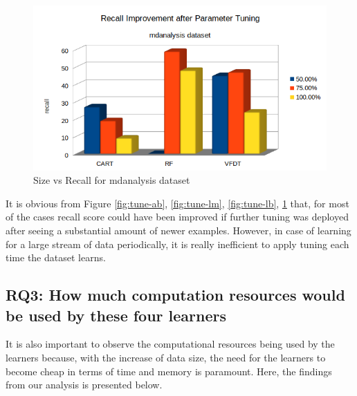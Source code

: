 \documentclass[sigplan]{acmart}\settopmatter{printfolios=true,printccs=false,printacmref=false}
\begin{document}
\begin{figure}[h]
	\includegraphics[width=\linewidth]{fig/tune-md.png}
	\caption{Size vs Recall for mdanalysis dataset}
	\label{fig:tune-md}
\end{figure}

It is obvious from Figure \ref{fig:tune-ab}, \ref{fig:tune-lm}, \ref{fig:tune-lb}, \ref{fig:tune-md} that, for most of the cases recall score could have been improved if further tuning was deployed after seeing a substantial amount of newer examples. However, in case of learning for a large stream of data periodically, it is really inefficient to apply tuning each time the dataset learns. 

\subsection{RQ3: How much computation resources would be used by these four learners}
It is also important to observe the computational resources being used by the learners because, with the increase of data size, the need for the learners to become cheap in terms of time and memory is paramount. Here, the findings from our analysis is presented below.
\end{document}
